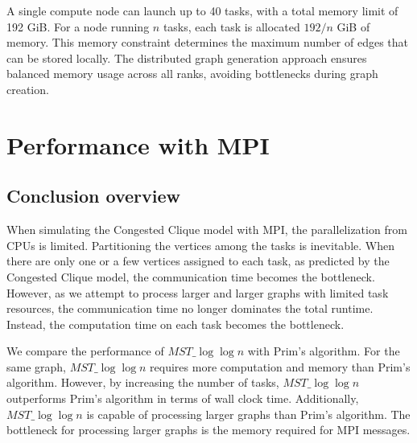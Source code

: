 \documentclass[english, 12pt, a4paper, elec, utf8, a-2b, online]{aaltothesis}
\newcommand{\mstalgo}{$MST\_\log\log{n}$}
\begin{document}
A single compute node can launch up to 40 tasks, with a total memory limit of 192 GiB. For a node running $n$ tasks, each task is allocated $192/n$ GiB of memory. This memory constraint determines the maximum number of edges that can be stored locally. The distributed graph generation approach ensures balanced memory usage across all ranks, avoiding bottlenecks during graph creation.
\clearpage

\section{Performance with MPI}
\label{sec:mpi_performance}
\subsection{Conclusion overview}
When simulating the Congested Clique model with MPI, the parallelization from CPUs is limited. Partitioning the vertices among the tasks is inevitable. When there are only one or a few vertices assigned to each task, as predicted by the Congested Clique model, the communication time becomes the bottleneck. However, as we attempt to process larger and larger graphs with limited task resources, the communication time no longer dominates the total runtime. Instead, the computation time on each task becomes the bottleneck. %



We compare the performance of \mstalgo{} with Prim's algorithm. For the same graph, \mstalgo{} requires more computation and memory than Prim's algorithm. However, by increasing the number of tasks, \mstalgo{} outperforms Prim's algorithm in terms of wall clock time. Additionally, \mstalgo{} is capable of processing larger graphs than Prim's algorithm. The bottleneck for processing larger graphs is the memory required for MPI messages.

\end{document}
